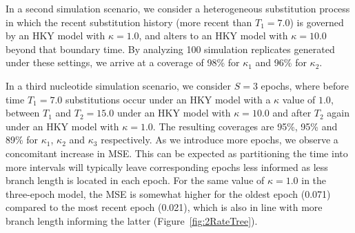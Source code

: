 In a second simulation scenario, we consider a heterogeneous substitution process in which the recent substitution history (more recent than $T_{1}=7.0$) is governed by an HKY model with $\kappa = 1.0$, and alters to an HKY model with $\kappa = 10.0$ beyond that boundary time. 
By analyzing 100 simulation replicates generated under these settings, we arrive at a coverage of 98\% for $\kappa_{1}$ and 96\% for $\kappa_{2}$.

In a third nucleotide simulation scenario, we consider $S=3$ epochs, where before time $T_{1}=7.0$ substitutions occur under an HKY model with a $\kappa$ value of $1.0$, between $T_{1}$ and $T_{2}=15.0$ under an HKY model with $\kappa=10.0$ and after $T_{2}$ again under an HKY model with $\kappa=1.0$. 
The resulting coverages are 95\%, 95\% and 89\% for $\kappa_{1}$, $\kappa_{2}$ and $\kappa_{3}$ respectively. 
As we introduce more epochs, we observe a concomitant increase in MSE.
This can be expected as partitioning the time into more intervals will typically leave corresponding epochs less informed as less branch length is located in each epoch. 
For the same value of $\kappa = 1.0$ in the three-epoch model, the MSE is somewhat higher for the oldest epoch (0.071) compared to the most recent epoch (0.021), which is also in line with more branch length informing the latter (Figure~\ref{fig:2RateTree}).

